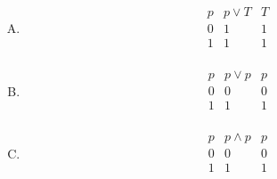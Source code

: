 {\begin{practices}
\begin{enumerate}[A.]
{\begin{table}[H]
\[\begin{array}{c|c|c}
                            \hline
                            0 & 0 & 0 \\
                            1 & 0 & 0 \\
                        \end{array}
                    \]
                \end{table}
            }
            \item
            {
                \begin{table}[H]
                    \[
                        \begin{array}{c|c|c}
                            \hline
                            p & p \vee T & T \\
                            \hline
                            0 & 1 & 1 \\
                            1 & 1 & 1 \\
                        \end{array}
                    \]
                \end{table}
            }
            \item
            {
                \begin{table}[H]
                    \[
                        \begin{array}{c|c|c}
                            \hline
                            p & p \vee p & p \\
                            \hline
                            0 & 0 & 0 \\
                            1 & 1 & 1 \\
                        \end{array}
                    \]
                \end{table}
            }
            \item
            {
                \begin{table}[H]
                    \[
                        \begin{array}{c|c|c}
                            \hline
                            p & p \wedge p & p \\
                            \hline
                            0 & 0 & 0 \\
                            1 & 1 & 1 \\
                        \end{array}
                    \]
                \end{table}
            }
        \end{enumerate}
    \end{practices}

}
